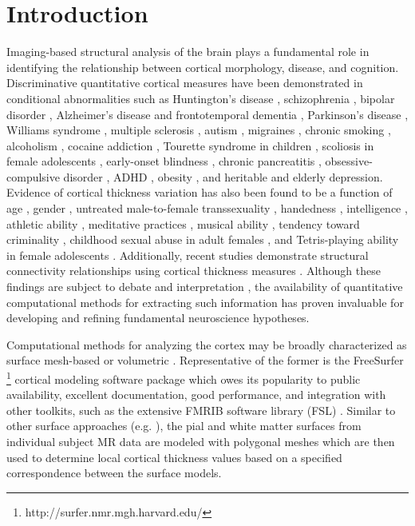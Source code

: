 \section{Introduction}

Imaging-based structural analysis of the brain plays a fundamental role
in identifying the relationship between cortical morphology, disease, and cognition.
Discriminative quantitative cortical measures have been demonstrated in conditional 
abnormalities such as 
Huntington's disease \citep{rosas2002,rosas2005,selemon2004}, 
schizophrenia \citep{nesvag2008}, bipolar disorder \cite{lyoo2006}, Alzheimer's disease and frontotemporal
dementia \citep{du2007,dickerson2009}, Parkinson's disease \citep{jubault2011}, Williams syndrome \citep{thompson2005},
multiple sclerosis \citep{ramasamy2009}, autism \citep{chung2005,hardan2006},
migraines \citep{dasilva2007}, chronic smoking \citep{kuhn2010}, alcoholism \citep{fortier2011},
cocaine addiction \citep{makris2008}, Tourette syndrome in children \citep{sowell2008},
scoliosis in
female adolescents \citep{wang2012}, 
early-onset blindness \citep{jiang2009},
chronic pancreatitis \citep{frokjaer2012},
obsessive-compulsive disorder \citep{shin2007}, ADHD \citep{almeida-montes2012}, obesity \citep{raji2010}, 
and heritable \citep{peterson2009}
and elderly \citep{ballmaier2004} depression.  Evidence of cortical thickness 
variation has also been found to be a function of age \citep{kochunov2011},
gender \citep{luders2006a}, untreated
male-to-female transsexuality \citep{luders2012},  handedness
\citep{luders2006,amunts2007}, intelligence \citep{shaw2006}, athletic
ability \citep{wei2011}, meditative practices \cite{lazar2005}, musical ability \citep{bermudez2009,foster2010}, 
tendency toward criminality \citep{raine2011}, 
childhood sexual abuse in adult females \citep{heim2013},
and Tetris-playing
ability in female adolescents \citep{haier2009}.  Additionally,
recent studies demonstrate structural 
connectivity relationships using cortical thickness measures
\citep{worsley2005,lerch2006,he2007,chen2008}.
Although these findings
are subject to debate and interpretation \citep{gernsbacher2007}, 
the availability of quantitative
computational methods for extracting such information
has proven invaluable for developing and refining fundamental 
neuroscience hypotheses.

Computational methods for analyzing the cortex may be 
broadly characterized as surface mesh-based or volumetric \citep{scott2009,clarkson2011}.  Representative of the former is the
FreeSurfer%
\footnote{
http://surfer.nmr.mgh.harvard.edu/
}
cortical modeling software package \citep{dale1999,fischl1999,fischl2000,fischl2002,fischl2004}
which owes its popularity to public availability, excellent documentation, 
good performance, and  integration with other toolkits, such as the extensive FMRIB software 
library (FSL) \citep{smith2004}.  Similar to other surface
approaches (e.g. \cite{davatzikos1996,magnotta1999,macdonald2000,kim2005}), the pial
and white matter surfaces from individual subject MR data are modeled with polygonal meshes  
which are then used to determine local cortical thickness values based on a specified correspondence between 
the surface models.


